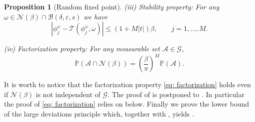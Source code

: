 \documentclass[a4paper,10pt,reqno]{article}
\theoremstyle{definition}
\theoremstyle{plain}
\theoremstyle{plain}
\theoremstyle{definition}
\theoremstyle{plain}
\theoremstyle{plain}
\newtheorem{prop}[definition]{Proposition}
\theoremstyle{plain}
\theoremstyle{definition}
\theoremstyle{definition}
\def \P{{\mathbb P}}
\def \A{\mathcal{A}}
\begin{document}
\begin{prop}[Random fixed point]
\smallskip

\noindent (iii) {\sc Stability property:} For any $\omega \in \mathcal{N}(\beta) \cap \mathcal{B}(\delta,\varepsilon,s)$ we have
\begin{equation} \label{eq: stability}
| \phi_j^{\omega} - \mathcal{T} ( \phi_j^{\omega} , \omega ) | \le (1+M|t|)\beta, \qquad j = 1,\ldots,M.
\end{equation}

\smallskip

\noindent (iv) {\sc Factorization property:} For any measurable set $\A \in \mathcal{G}$,
\begin{equation} \label{eq: factorization}
\P (\A \cap \mathcal{N}(\beta)) = \left ( \frac{\beta}{\pi} \right )^M \P ( \A ).
\end{equation}
\end{prop}

It is worth to notice that the factorization property \eqref{eq: factorization} holds even if $\mathcal{N}(\beta)$ is not independent of $\mathcal{G}$.
The proof of  is postponed to . 
In particular the proof of \eqref{eq: factorization} relies on  below.
Finally we prove the lower bound of the large deviations principle which, together with , yields .
\end{document}
